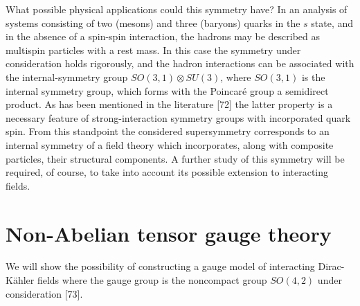 \documentclass[a4paper,12pt]{article}
\begin{document}
What possible physical applications could this symmetry have? In
an analysis of systems consisting of two (mesons) and three
(baryons) quarks in the $s$ state, and in the absence of a
spin-spin interaction, the hadrons may be described as multispin
particles with a rest mass. In this case the symmetry under
consideration holds rigorously, and the hadron interactions can be
associated with the internal-symmetry group $SO(3,1)\otimes
SU(3)$, where $ SO(3,1)$ is the internal symmetry group, which
forms with the Poincar\'e group a semidirect product. As has been
mentioned in the literature [72] the latter property is a
necessary feature of strong-interaction symmetry groups with
incorporated quark spin. From this standpoint the considered
supersymmetry corresponds to an internal symmetry of a field
theory which incorporates, along with composite particles, their
structural components. A further study of this symmetry will be
required, of course, to take into account its possible extension
to interacting fields.

\section{Non-Abelian tensor gauge theory}

We will show the possibility of constructing a gauge model of
interacting Dirac-K\"ahler fields where the gauge group is the
noncompact group $SO(4,2)$ under consideration [73].
\end{document}

